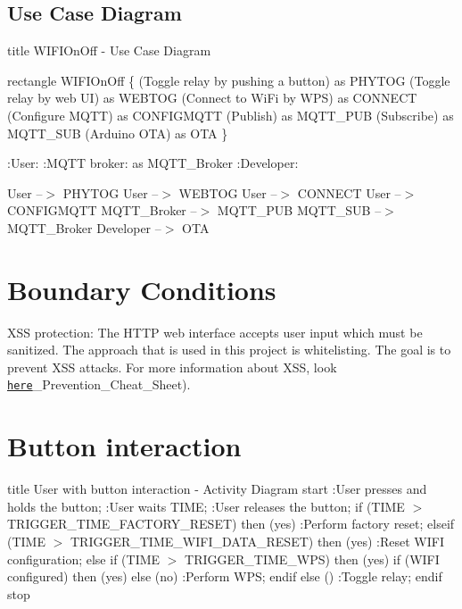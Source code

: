 \subsection*{Use Case Diagram}

title W\-I\-F\-I\-On\-Off -\/ Use Case Diagram

rectangle W\-I\-F\-I\-On\-Off \{ (Toggle relay by pushing a button) as P\-H\-Y\-T\-O\-G (Toggle relay by web U\-I) as W\-E\-B\-T\-O\-G (Connect to Wi\-Fi by W\-P\-S) as C\-O\-N\-N\-E\-C\-T (Configure M\-Q\-T\-T) as C\-O\-N\-F\-I\-G\-M\-Q\-T\-T (Publish) as M\-Q\-T\-T\-\_\-\-P\-U\-B (Subscribe) as M\-Q\-T\-T\-\_\-\-S\-U\-B (Arduino O\-T\-A) as O\-T\-A \}

\-:User\-: \-:M\-Q\-T\-T broker\-: as M\-Q\-T\-T\-\_\-\-Broker \-:Developer\-:

User --$>$ P\-H\-Y\-T\-O\-G User --$>$ W\-E\-B\-T\-O\-G User --$>$ C\-O\-N\-N\-E\-C\-T User --$>$ C\-O\-N\-F\-I\-G\-M\-Q\-T\-T M\-Q\-T\-T\-\_\-\-Broker --$>$ M\-Q\-T\-T\-\_\-\-P\-U\-B M\-Q\-T\-T\-\_\-\-S\-U\-B --$>$ M\-Q\-T\-T\-\_\-\-Broker Developer --$>$ O\-T\-A 

\section*{Boundary Conditions}


\begin{DoxyItemize}
\item X\-S\-S protection\-: The H\-T\-T\-P web interface accepts user input which must be sanitized. The approach that is used in this project is whitelisting. The goal is to prevent X\-S\-S attacks. For more information about X\-S\-S, look \href{https://www.owasp.org/index.php/XSS_(Cross_Site_Scripting}{\tt here}\-\_\-\-Prevention\-\_\-\-Cheat\-\_\-\-Sheet).
\end{DoxyItemize}

\section*{Button interaction}

title User with button interaction -\/ Activity Diagram start \-:User presses and holds the button; \-:User waits T\-I\-M\-E; \-:User releases the button; if (T\-I\-M\-E $>$ T\-R\-I\-G\-G\-E\-R\-\_\-\-T\-I\-M\-E\-\_\-\-F\-A\-C\-T\-O\-R\-Y\-\_\-\-R\-E\-S\-E\-T) then (yes) \-:Perform factory reset; elseif (T\-I\-M\-E $>$ T\-R\-I\-G\-G\-E\-R\-\_\-\-T\-I\-M\-E\-\_\-\-W\-I\-F\-I\-\_\-\-D\-A\-T\-A\-\_\-\-R\-E\-S\-E\-T) then (yes) \-:Reset W\-I\-F\-I configuration; else if (T\-I\-M\-E $>$ T\-R\-I\-G\-G\-E\-R\-\_\-\-T\-I\-M\-E\-\_\-\-W\-P\-S) then (yes) if (W\-I\-F\-I configured) then (yes) else (no) \-:Perform W\-P\-S; endif else () \-:Toggle relay; endif stop  